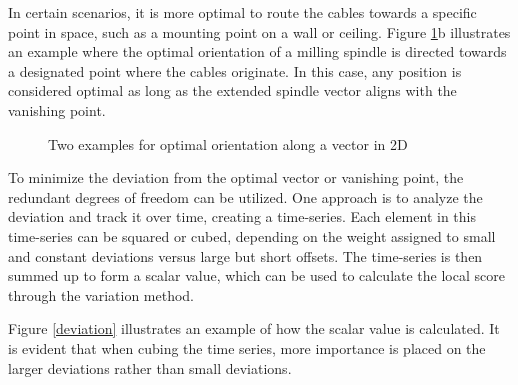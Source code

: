 In certain scenarios, it is more optimal to route the cables towards a specific point in space, such as a mounting point on a wall or ceiling. Figure \ref{OOPti}b illustrates an example where the optimal orientation of a milling spindle is directed towards a designated point where the cables originate. In this case, any position is considered optimal as long as the extended spindle vector aligns with the vanishing point.


\begin{figure}[H]%
	\centering
	\qquad
	\caption{Two examples for optimal orientation along a vector in 2D}%
	\label{OOPti}%
\end{figure}



To minimize the deviation from the optimal vector or vanishing point, the redundant degrees of freedom can be utilized. One approach is to analyze the deviation and track it over time, creating a time-series. Each element in this time-series can be squared or cubed, depending on the weight assigned to small and constant deviations versus large but short offsets. The time-series is then summed up to form a scalar value, which can be used to calculate the local score through the variation method.


Figure \ref{deviation} illustrates an example of how the scalar value is calculated. It is evident that when cubing the time series, more importance is placed on the larger deviations rather than small deviations.


